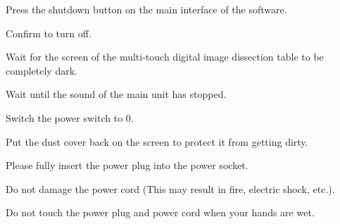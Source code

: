 \documentclass[11pt,a4paper]{article}
\begin{document}

\begin{tbkSteps}
  \item Press the shutdown button on the main interface of the software.
  \item Confirm to turn off.
  \item Wait for the screen of the multi-touch digital image dissection table
        to be completely dark.
  \item Wait until the sound of the main unit has stopped.
  \item Switch the power switch to 0.
  \item Put the dust cover back on the screen to protect it from getting dirty.
\end{tbkSteps}




\begin{tbkCallout}[type=notice, title=Safety Protection Mechanism]
\end{tbkCallout}







\begin{tbkWarningList}
  \item Please fully insert the power plug into the power socket.
  \item Do not damage the power cord (This may result in fire, electric shock, etc.).
  \item Do not touch the power plug and power cord when your hands are wet.
\end{tbkWarningList}


\begin{tbkCallout}[type=caution]
\end{tbkCallout}
\end{document}
